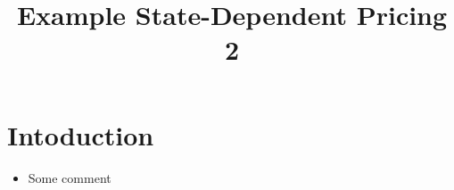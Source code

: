 \documentclass[a4paper,10pt]{article}  %
\title{ Example State-Dependent Pricing 2 \vspace{-5em}} %
\date{ \vspace{-0em} }
\begin{document}
\maketitle

\section{Intoduction} %
\label{sec:intoduction}
\begin{itemize}
   
   \item Some comment

\end{itemize}
\end{document}
